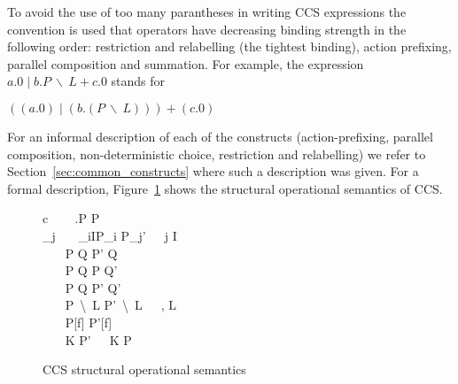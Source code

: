 	To avoid the use of too many parantheses in writing CCS expressions 
	the convention is used that operators have decreasing binding strength in 
	the following order: restriction and relabelling (the tightest binding), 
	action prefixing, parallel composition and summation. For example, the 
	expression $a.0 \mid b.P\ \backslash\ L + c.0$ stands for
		
	\begin{center}$((a.0) \mid (b.(P\ \backslash\ L))) + (c.0)$\end{center}
		
	For an informal description of each of the constructs (action-prefixing, 
	parallel composition, non-deterministic choice, restriction and relabelling) 
	we refer to Section~\ref{sec:common_constructs} where such a description was 
	given. For a formal description, Figure~\ref{fig:ccs_sos} shows the 
	structural operational semantics of CCS.


\begin{figure}[t!]
\begin{ARRAY}{c}
	\ \ \ \Inference{                              }
	                            {\alpha.P \infarrow{\alpha} P} \vspace{10pt}\\
	_j\ \ \ 
	                              {\sum_{i\in I}P_i \infarrow{\alpha} P_j'}\ \ \ j \in I\vspace{10pt}\\
	\ \ \ 
	                             {P \mid Q \infarrow{\alpha} P' \mid Q} \vspace{10pt}\\
	\ \ \ 
	                             {P \mid Q \infarrow{\alpha} P \mid Q'} \vspace{10pt}\\
	\ \ \ 
	                             {P \mid Q \infarrow{\tau} P' \mid Q'} \vspace{10pt}\\
	\ \ \ 
	                              {P\ \backslash\ L \infarrow{\alpha} P'\  \backslash\ L}\ \ \ \alpha, \overline{\alpha} \notin L\vspace{10pt}\\
	\ \ \ 
	                             {P[f]  P'[f]} \vspace{10pt}\\
	\ \ \ 
	                             {K \infarrow{\alpha} P'}\ \ \ K  P

\end{ARRAY}
\caption{CCS structural operational semantics}\label{fig:ccs_sos}
\end{figure}

